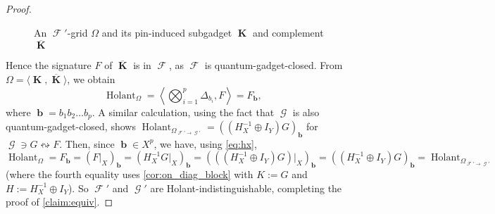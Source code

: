 \documentclass{article}
\theoremstyle{remark}
\theoremstyle{definition}
\DeclareMathOperator{\vk}{\mathbf{K}}
\DeclareMathOperator{\vb}{\mathbf{b}}
\DeclareMathOperator{\fc}{\mathcal{F}}
\DeclareMathOperator{\gc}{\mathcal{G}}
\DeclareMathOperator{\holant}{Holant}
\begin{document}
\begin{proof}
\begin{figure}[ht!]
         \caption{An $\fc'$-grid $\Omega$ and its pin-induced subgadget $\vk$ and complement $\overline{\vk}$}
        \label{fig:pin_gadget}
    \end{figure}
    Hence the signature $F$ of $\overline{\vk}$ is in $\fc$, as $\fc$ is quantum-gadget-closed.
    From $\Omega = \langle \vk,\overline{\vk} \rangle$, we obtain
    \[
        \holant_\Omega = \left\langle \bigotimes_{i=1}^p \Delta_{b_i}, F \right\rangle = F_{\vb},
    \]
    where $\vb = b_1b_2 \ldots b_p$.
    A similar calculation, using the fact that $\gc$ is also quantum-gadget-closed, 
    shows $\holant_{\Omega_{\fc'\to\gc'}} = ((H^{-1}_X \oplus I_Y)G)_{\vb}$ for
    $\gc \ni G \leftrightsquigarrow F$. Then, since $\vb \in X^p$, we have, using \eqref{eq:hx},
    \[
        \holant_\Omega = F_{\vb} = (F|_X)_{\vb} = (H_X^{-1} G|_X)_{\vb} = 
        (((H^{-1}_X \oplus I_Y)G)|_X)_{\vb}
        = ((H^{-1}_X \oplus I_Y)G)_{\vb}
        = \holant_{\Omega_{\fc'\to\gc'}}
    \]
    (where the fourth equality uses \autoref{cor:on_diag_block} with $K := G$ and
    $H := H_X^{-1} \oplus I_Y$).
    So $\fc'$ and $\gc'$ are Holant-indistinguishable, completing the proof of \autoref{claim:equiv}.


\end{proof}
\end{document}
